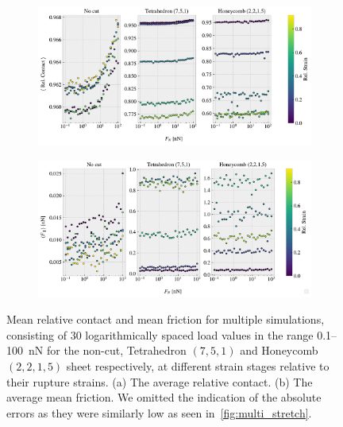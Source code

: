 \begin{figure}[H]
  \centering
  \begin{subfigure}[t]{\textwidth}
      \centering
      \includegraphics[width=\textwidth]{figures/baseline/multi_FN_contact_compare.pdf}
      \caption{}
      \label{fig:fig:multi_load_contact}
  \end{subfigure}
  \hfill
  \begin{subfigure}[t]{\textwidth}
      \centering
      \includegraphics[width=\textwidth]{figures/baseline/multi_FN_mean_compare.pdf}
      \caption{}
      \label{fig:multi_load_fric}
  \end{subfigure}
  \hfill
     \caption{Mean relative contact and mean friction for multiple simulations, consisting of 30 logarithmically spaced load values in the range 0.1--\SI{100}{nN} for the non-cut, Tetrahedron $(7,5,1)$ and Honeycomb $(2,2,1,5)$ sheet respectively, at different strain stages relative to their rupture strains. (a) The average relative contact. (b) The average mean friction. We omitted the indication of the absolute errors as they were similarly low as seen in~\cref{fig:multi_stretch}.}
     \label{fig:multi_load}
\end{figure}

